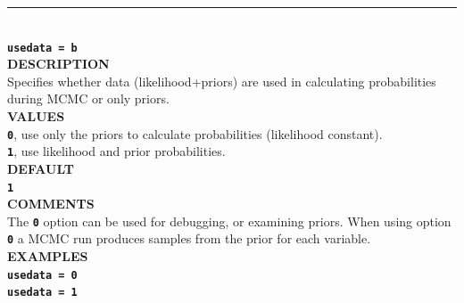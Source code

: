 \documentclass[a4paper]{book}
\numberwithin{equation}{section} \renewcommand{\baselinestretch}{0.55}
\begin{document}
\noindent\rule{\textwidth}{0.8pt} \\
\textbf{{\Large \texttt{usedata = b}}} \vspace{5pt}\\
\textbf{DESCRIPTION} \vspace{5pt}\\
Specifies whether data (likelihood+priors) are used in calculating probabilities during MCMC or only priors.\vspace{5pt}\\
\textbf{VALUES} \vspace{5pt}\\
\textbf{\texttt{0}}, use only the priors to calculate probabilities (likelihood constant).\vspace{5pt}\\
\textbf{\texttt{1}}, use likelihood and prior probabilities. \vspace{5pt}\\
\textbf{DEFAULT}\vspace{5pt}\\
\textbf{\texttt{1}} \vspace{5pt}\\
\textbf{COMMENTS} \vspace{5pt}\\
The \textbf{\texttt{0}} option can be used for debugging, or examining priors. When using option \textbf{\texttt{0}} a MCMC run produces samples from the prior for each variable. \vspace{5pt}\\
\textbf{EXAMPLES} \vspace{5pt}\\
\textbf{\texttt{usedata = 0}} \vspace{5pt}\\
\textbf{\texttt{usedata = 1}} \vspace{10pt}\\
\end{document}
